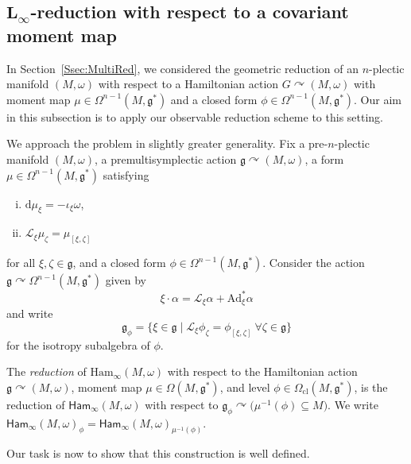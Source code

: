 \documentclass[10pt,a4paper]{amsart}
\numberwithin{equation}{section}
\DeclareMathOperator{\action}{\curvearrowright}
\newcommand{\g}{\mathfrak{g}}
\newcommand{\Ham}{\mathsf{Ham}}
\renewcommand{\L}{\mathscr{L}}
\newcommand{\Ad}{\mathrm{Ad}}
\renewcommand{\subset}{\subseteq}
\renewcommand{\d}{\mathrm{d}}
\begin{document}
\subsection[L\_infty-reduction with respect to a covariant moment map]{$\boldsymbol{L_\infty}$-reduction with respect to a covariant moment map}\label{Ssec:LinftyReductionMomentMap}

In Section~\ref{Ssec:MultiRed}, we considered the geometric reduction of an $n$-plectic manifold $(M,\omega)$ with respect to a Hamiltonian action $G\curvearrowright (M,\omega)$ with moment map $\mu\in\Omega^{n-1}(M,\g^*)$ and a closed form $\phi\in\Omega^{n-1}(M,\g^*)$. Our aim in this subsection is to apply our observable reduction scheme to this setting.

We approach the problem in slightly greater generality. Fix a pre-$n$-plectic manifold $(M,\omega)$, a premultisymplectic action $\g\curvearrowright(M,\omega)$, a form $\mu\in\Omega^{n-1}(M,\g^*)$ satisfying
\begin{enumerate}[i.]\itemsep=0pt
	\item[(i)] $\d\mu_\xi = -\iota_\xi\omega$,
	\item[(ii)] $\L_\xi\mu_\zeta = \mu_{[\xi,\zeta]}$
\end{enumerate}
for all $\xi,\zeta\in\g$, and a closed form $\phi\in\Omega^{n-1}(M,\g^*)$. Consider the action $\g\curvearrowright\Omega^{n-1}(M,\g^*)$ given by
\[
	\xi\cdot \alpha = \L_\xi\alpha + \Ad_\xi^*\alpha
\]
and write
\[
	\g_\phi = \bigl\{\xi\in\g \mid  \L_\xi\phi_\zeta = \phi_{[\xi,\zeta]} \ \forall\zeta\in\g\bigr\}
\]
for the isotropy subalgebra of $\phi$.

\begin{Definition}\label{def:observable_reduction_wrt_moment_map}
	The \emph{reduction} of $\mathrm{Ham}_\infty(M,\omega)$ with respect to the Hamiltonian action $\g\curvearrowright(M,\omega)$, moment map $\mu\in\Omega(M,\g^*)$, and level $\phi\in\Omega_{\mathrm{cl}}(M,\g^*)$, is the reduction of $\Ham_\infty(M,\omega)$ with respect to $\g_\phi\action\bigl(\mu^{-1}(\phi)\subset M\bigr)$. We write $\Ham_\infty(M,\omega)_\phi = \Ham_\infty(M,\omega)_{\mu^{-1}(\phi)}$.
\end{Definition}

Our task is now to show that this construction is well defined.
\end{document}
